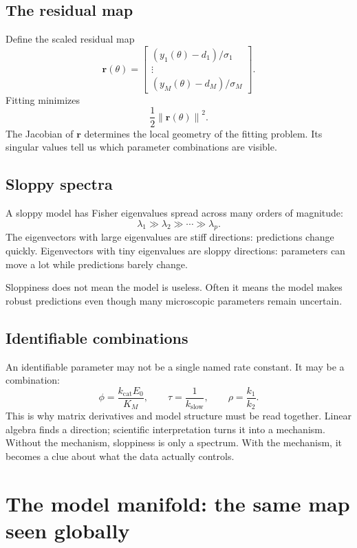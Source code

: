 \documentclass[a4paper]{article}
\newcommand{\vect}[1]{\mathbf{#1}}
\newcommand{\param}{\theta}
\newcommand{\norm}[1]{\left\lVert #1\right\rVert}
\begin{document}
\subsection{The residual map}

Define the scaled residual map
\[
  \vect{r}(\param)
  =
  \begin{bmatrix}
    (y_1(\param)-d_1)/\sigma_1\\
    \vdots\\
    (y_M(\param)-d_M)/\sigma_M
  \end{bmatrix}.
\]
Fitting minimizes
\[
  \frac{1}{2}\norm{\vect{r}(\param)}^2.
\]
The Jacobian of \(\vect{r}\) determines the local geometry of the fitting problem.  Its singular values tell us which parameter combinations are visible.

\subsection{Sloppy spectra}

A sloppy model has Fisher eigenvalues spread across many orders of magnitude:
\[
  \lambda_1\gg \lambda_2\gg\cdots\gg\lambda_p.
\]
The eigenvectors with large eigenvalues are stiff directions: predictions change quickly.  Eigenvectors with tiny eigenvalues are sloppy directions: parameters can move a lot while predictions barely change.

\begin{remark}
  Sloppiness does not mean the model is useless.  Often it means the model makes robust predictions even though many microscopic parameters remain uncertain.
\end{remark}

\subsection{Identifiable combinations}

An identifiable parameter may not be a single named rate constant.  It may be a combination:
\[
  \phi
  =
  \frac{k_{\mathrm{cat}}E_0}{K_M},
  \qquad
  \tau
  =
  \frac{1}{k_{\mathrm{slow}}},
  \qquad
  \rho
  =
  \frac{k_1}{k_2}.
\]
This is why matrix derivatives and model structure must be read together.  Linear algebra finds a direction; scientific interpretation turns it into a mechanism.  Without the mechanism, sloppiness is only a spectrum.  With the mechanism, it becomes a clue about what the data actually controls.

\section{The model manifold: the same map seen globally}
\end{document}
